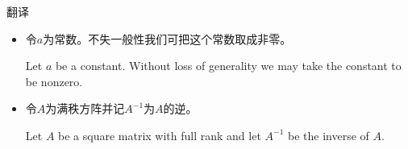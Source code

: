 \documentclass{ctexbeamer}
\begin{document}
\begin{frame}{翻译}
\begin{itemize}
\item 
    令$a$为常数。不失一般性我们可把这个常数取成非零。

Let $a$ be a constant. Without loss of generality we may take the constant to be nonzero.
\item 
    令$A$为满秩方阵并记$A^{-1}$为$A$的逆。
    
Let $A$ be a square matrix with full rank and let $A^{-1}$ be the inverse of $A$.
\end{itemize}
\end{frame}
\end{document}
